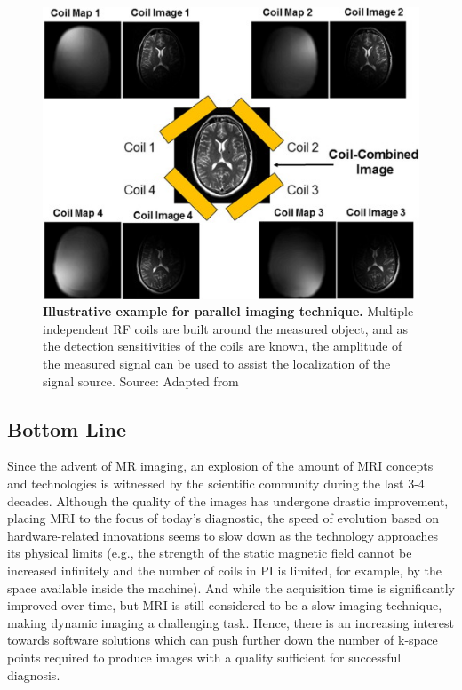 \begin{figure}[htb]
    \centering
    \includegraphics[width=0.8\linewidth]{images/parallel_imaging.jpg}
    \caption{\textbf{Illustrative example for parallel imaging technique.} Multiple independent RF coils are built around the measured object, and as the detection sensitivities of the coils are known, the amplitude of the measured signal can be used to assist the localization of the signal source. Source: Adapted from~\cite{hamilton_recent_2017}}
    \label{fig:parallel_imaging}
\end{figure}

\subsection{Bottom Line}
Since the advent of MR imaging, an explosion of the amount of MRI concepts and technologies is witnessed by the scientific community during the last 3-4 decades. Although the quality of the images has undergone drastic improvement, placing MRI to the focus of today's diagnostic, the speed of evolution based on hardware-related innovations seems to slow down as the technology approaches its physical limits (e.g., the strength of the static magnetic field cannot be increased infinitely and the number of coils in PI is limited, for example, by the space available inside the machine). And while the acquisition time is significantly improved over time, but MRI is still considered to be a slow imaging technique, making dynamic imaging a challenging task. Hence, there is an increasing interest towards software solutions which can push further down the number of k-space points required to produce images with a quality sufficient for successful diagnosis.

\clearpage